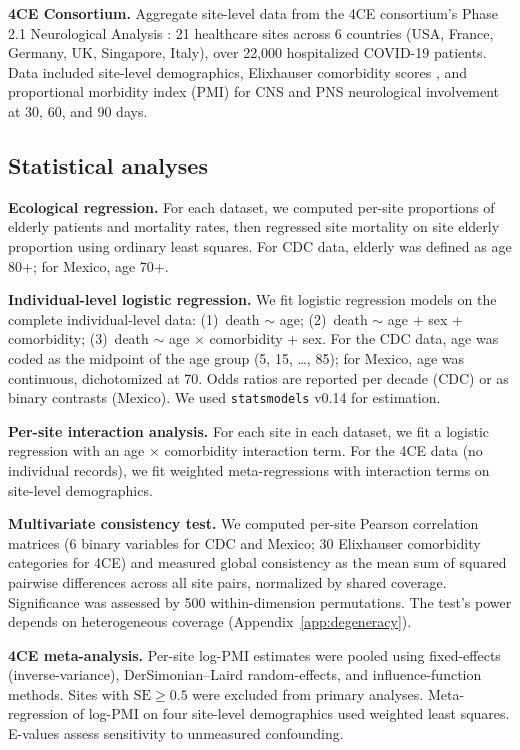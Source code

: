 \documentclass{article}
\begin{document}
\textbf{4CE Consortium.}  Aggregate site-level data from the 4CE consortium's
Phase 2.1 Neurological Analysis \cite{four_ce_neuro2021}: 21 healthcare sites
across 6 countries (USA, France, Germany, UK, Singapore, Italy), over 22,000
hospitalized COVID-19 patients.  Data included site-level demographics,
Elixhauser comorbidity scores \cite{elixhauser1998}, and proportional morbidity
index (PMI) for CNS and PNS neurological involvement at 30, 60, and 90 days.

\subsection{Statistical analyses}

\textbf{Ecological regression.}  For each dataset, we computed per-site
proportions of elderly patients and mortality rates, then regressed site
mortality on site elderly proportion using ordinary least squares.  For CDC
data, elderly was defined as age 80+; for Mexico, age 70+.

\textbf{Individual-level logistic regression.}  We fit logistic regression
models on the complete individual-level data: (1)~death $\sim$ age;
(2)~death $\sim$ age + sex + comorbidity; (3)~death $\sim$ age $\times$
comorbidity + sex.  For the CDC data, age was coded as the midpoint of the
age group (5, 15, \ldots, 85); for Mexico, age was continuous, dichotomized
at 70.  Odds ratios are reported per decade (CDC) or as binary contrasts
(Mexico).  We used \texttt{statsmodels} v0.14 for estimation.

\textbf{Per-site interaction analysis.}  For each site in each dataset, we
fit a logistic regression with an age $\times$ comorbidity interaction term.
For the 4CE data (no individual records), we fit weighted meta-regressions
with interaction terms on site-level demographics.

\textbf{Multivariate consistency test.}  We computed per-site Pearson
correlation matrices (6 binary variables for CDC and Mexico; 30 Elixhauser
comorbidity categories for 4CE) and measured global consistency as the mean
sum of squared pairwise differences across all site pairs, normalized by
shared coverage.  Significance was assessed by 500 within-dimension
permutations.  The test's power depends on heterogeneous coverage
(Appendix~\ref{app:degeneracy}).

\textbf{4CE meta-analysis.}  Per-site log-PMI estimates were pooled using
fixed-effects (inverse-variance), DerSimonian--Laird random-effects, and
influence-function methods.  Sites with $\text{SE} \geq 0.5$ were excluded
from primary analyses.  Meta-regression of log-PMI on four site-level
demographics used weighted least squares.  E-values \cite{vanderweele2017}
assess sensitivity to unmeasured confounding.
\end{document}
